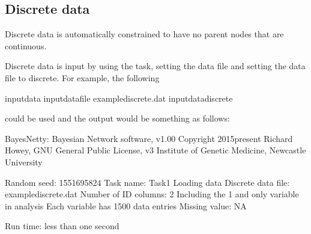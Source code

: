 \documentclass[letterpaper,10pt,english]{sphinxmanual}
\begin{document}
\subsection{Discrete data}
\label{\detokenize{input-data:discrete-data}}\label{\detokenize{input-data:input-data-discrete}}
\sphinxAtStartPar
Discrete data is automatically constrained to have no parent nodes that are continuous.

\sphinxAtStartPar
Discrete data is input by using the  task, setting the data file and setting the data file to discrete. For example, the following

\begin{sphinxVerbatim}[commandchars=\\\{\}]
\PYGZhy{}input\PYGZhy{}data
\PYGZhy{}input\PYGZhy{}data\PYGZhy{}file example\PYGZhy{}discrete.dat
\PYGZhy{}input\PYGZhy{}data\PYGZhy{}discrete
\end{sphinxVerbatim}

\sphinxAtStartPar
could be used and the output would be something as follows:

\begin{sphinxVerbatim}[commandchars=\\\{\}]
BayesNetty: Bayesian Network software, v1.00
\PYGZhy{}\PYGZhy{}\PYGZhy{}\PYGZhy{}\PYGZhy{}\PYGZhy{}\PYGZhy{}\PYGZhy{}\PYGZhy{}\PYGZhy{}\PYGZhy{}\PYGZhy{}\PYGZhy{}\PYGZhy{}\PYGZhy{}\PYGZhy{}\PYGZhy{}\PYGZhy{}\PYGZhy{}\PYGZhy{}\PYGZhy{}\PYGZhy{}\PYGZhy{}\PYGZhy{}\PYGZhy{}\PYGZhy{}\PYGZhy{}\PYGZhy{}\PYGZhy{}\PYGZhy{}\PYGZhy{}\PYGZhy{}\PYGZhy{}\PYGZhy{}\PYGZhy{}\PYGZhy{}\PYGZhy{}\PYGZhy{}\PYGZhy{}\PYGZhy{}\PYGZhy{}\PYGZhy{}\PYGZhy{}\PYGZhy{}\PYGZhy{}\PYGZhy{}\PYGZhy{}\PYGZhy{}\PYGZhy{}\PYGZhy{}
Copyright 2015\PYGZhy{}present Richard Howey, GNU General Public License, v3
Institute of Genetic Medicine, Newcastle University

Random seed: 1551695824
\PYGZhy{}\PYGZhy{}\PYGZhy{}\PYGZhy{}\PYGZhy{}\PYGZhy{}\PYGZhy{}\PYGZhy{}\PYGZhy{}\PYGZhy{}\PYGZhy{}\PYGZhy{}\PYGZhy{}\PYGZhy{}\PYGZhy{}\PYGZhy{}\PYGZhy{}\PYGZhy{}\PYGZhy{}\PYGZhy{}\PYGZhy{}\PYGZhy{}\PYGZhy{}\PYGZhy{}\PYGZhy{}\PYGZhy{}\PYGZhy{}\PYGZhy{}\PYGZhy{}\PYGZhy{}\PYGZhy{}\PYGZhy{}\PYGZhy{}\PYGZhy{}\PYGZhy{}\PYGZhy{}\PYGZhy{}\PYGZhy{}\PYGZhy{}\PYGZhy{}\PYGZhy{}\PYGZhy{}\PYGZhy{}\PYGZhy{}\PYGZhy{}\PYGZhy{}\PYGZhy{}\PYGZhy{}\PYGZhy{}\PYGZhy{}
Task name: Task\PYGZhy{}1
Loading data
Discrete data file: example\PYGZhy{}discrete.dat
Number of ID columns: 2
Including the 1 and only variable in analysis
Each variable has 1500 data entries
Missing value: NA
\PYGZhy{}\PYGZhy{}\PYGZhy{}\PYGZhy{}\PYGZhy{}\PYGZhy{}\PYGZhy{}\PYGZhy{}\PYGZhy{}\PYGZhy{}\PYGZhy{}\PYGZhy{}\PYGZhy{}\PYGZhy{}\PYGZhy{}\PYGZhy{}\PYGZhy{}\PYGZhy{}\PYGZhy{}\PYGZhy{}\PYGZhy{}\PYGZhy{}\PYGZhy{}\PYGZhy{}\PYGZhy{}\PYGZhy{}\PYGZhy{}\PYGZhy{}\PYGZhy{}\PYGZhy{}\PYGZhy{}\PYGZhy{}\PYGZhy{}\PYGZhy{}\PYGZhy{}\PYGZhy{}\PYGZhy{}\PYGZhy{}\PYGZhy{}\PYGZhy{}\PYGZhy{}\PYGZhy{}\PYGZhy{}\PYGZhy{}\PYGZhy{}\PYGZhy{}\PYGZhy{}\PYGZhy{}\PYGZhy{}\PYGZhy{}

Run time: less than one second
\end{sphinxVerbatim}
\end{document}
